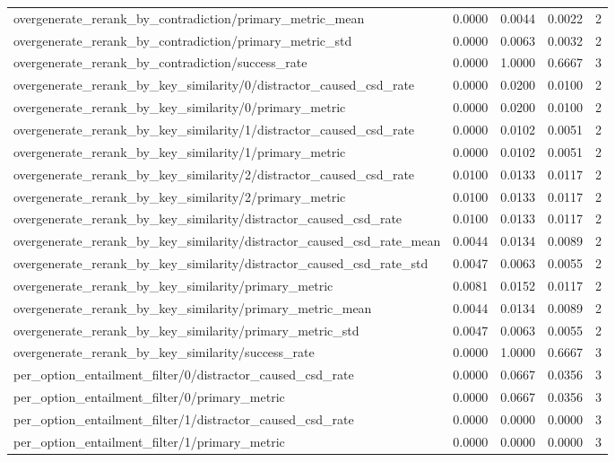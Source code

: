 \begin{table}[h]
\begin{tabular}{lrrrr}
overgenerate_rerank_by_contradiction/primary_metric_mean & 0.0000 & 0.0044 & 0.0022 & 2 \\
overgenerate_rerank_by_contradiction/primary_metric_std & 0.0000 & 0.0063 & 0.0032 & 2 \\
overgenerate_rerank_by_contradiction/success_rate & 0.0000 & 1.0000 & 0.6667 & 3 \\
overgenerate_rerank_by_key_similarity/0/distractor_caused_csd_rate & 0.0000 & 0.0200 & 0.0100 & 2 \\
overgenerate_rerank_by_key_similarity/0/primary_metric & 0.0000 & 0.0200 & 0.0100 & 2 \\
overgenerate_rerank_by_key_similarity/1/distractor_caused_csd_rate & 0.0000 & 0.0102 & 0.0051 & 2 \\
overgenerate_rerank_by_key_similarity/1/primary_metric & 0.0000 & 0.0102 & 0.0051 & 2 \\
overgenerate_rerank_by_key_similarity/2/distractor_caused_csd_rate & 0.0100 & 0.0133 & 0.0117 & 2 \\
overgenerate_rerank_by_key_similarity/2/primary_metric & 0.0100 & 0.0133 & 0.0117 & 2 \\
overgenerate_rerank_by_key_similarity/distractor_caused_csd_rate & 0.0100 & 0.0133 & 0.0117 & 2 \\
overgenerate_rerank_by_key_similarity/distractor_caused_csd_rate_mean & 0.0044 & 0.0134 & 0.0089 & 2 \\
overgenerate_rerank_by_key_similarity/distractor_caused_csd_rate_std & 0.0047 & 0.0063 & 0.0055 & 2 \\
overgenerate_rerank_by_key_similarity/primary_metric & 0.0081 & 0.0152 & 0.0117 & 2 \\
overgenerate_rerank_by_key_similarity/primary_metric_mean & 0.0044 & 0.0134 & 0.0089 & 2 \\
overgenerate_rerank_by_key_similarity/primary_metric_std & 0.0047 & 0.0063 & 0.0055 & 2 \\
overgenerate_rerank_by_key_similarity/success_rate & 0.0000 & 1.0000 & 0.6667 & 3 \\
per_option_entailment_filter/0/distractor_caused_csd_rate & 0.0000 & 0.0667 & 0.0356 & 3 \\
per_option_entailment_filter/0/primary_metric & 0.0000 & 0.0667 & 0.0356 & 3 \\
per_option_entailment_filter/1/distractor_caused_csd_rate & 0.0000 & 0.0000 & 0.0000 & 3 \\
per_option_entailment_filter/1/primary_metric & 0.0000 & 0.0000 & 0.0000 & 3 \\

\end{tabular}
\end{table}
